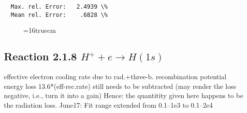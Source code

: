 \documentclass[12pt,dvipdfmx]{article}
\begin{document}
\begin{small}
\begin{verbatim}
  Max. rel. Error:   2.4939 \%
  Mean rel. Error:    .6828 \%

\end{verbatim}\end{small}
\begin{figure} \label{2.1.5io}
\epsfxsize=16truecm
\end{figure}
\newpage

\subsection{
  Reaction 2.1.8  $H^+ + e  \rightarrow H(1s) $
}

   effective electron cooling rate due to rad.+three-b. recombination
   potential energy loss 13.6*(eff-rec.rate) still needs to be
   subtracted (may render the loss negative, i.e., turn it into a gain)
   Hence: the quantitity given here happens to be the radiation loss.
   June17: Fit range extended from 0.1--1e3 to 0.1--2e4
\end{document}
